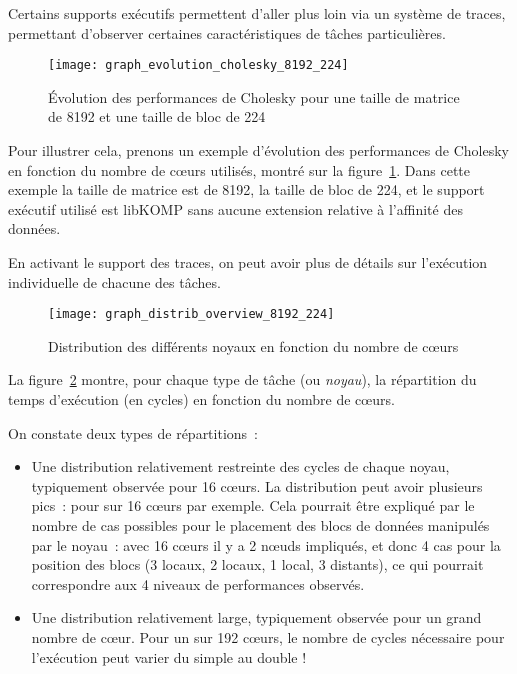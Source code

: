 Certains supports exécutifs permettent d'aller plus loin via un système de traces, permettant d'observer certaines caractéristiques de tâches particulières.

\begin{figure}[t!]
  \centering
  \texttt{[image: graph\_evolution\_cholesky\_8192\_224]}
  \caption{Évolution des performances de Cholesky pour une taille de matrice de 8192 et une taille de bloc de 224}\label{fig:contribs:apps:cholesky:overview-8192-224}
\end{figure}

Pour illustrer cela, prenons un exemple d'évolution des performances de Cholesky en fonction du nombre de cœurs utilisés, montré sur la figure~\ref{fig:contribs:apps:cholesky:overview-8192-224}. Dans cette exemple la taille de matrice est de 8192, la taille de bloc de 224, et le support exécutif utilisé est libKOMP sans aucune extension relative à l'affinité des données.

En activant le support des traces, on peut avoir plus de détails sur l'exécution individuelle de chacune des tâches.

\begin{figure}[h!]
  \centering
  \texttt{[image: graph\_distrib\_overview\_8192\_224]}
  \caption{Distribution des différents noyaux en fonction du nombre de cœurs}\label{fig:contribs:apps:cholesky:distrib-overview-8192-224}
\end{figure}

La figure~\ref{fig:contribs:apps:cholesky:distrib-overview-8192-224} montre, pour chaque type de tâche (ou \emph{noyau}), la répartition du temps d'exécution (en cycles) en fonction du nombre de cœurs.

On constate deux types de répartitions~:
\begin{itemize}
  \item Une distribution relativement restreinte des cycles de chaque noyau, typiquement observée pour 16 cœurs.
    La distribution peut avoir plusieurs pics~: pour \gemm sur 16 cœurs par exemple.
    Cela pourrait être expliqué par le nombre de cas possibles pour le placement des blocs de données manipulés par le noyau~: avec 16 cœurs il y a 2 nœuds impliqués, et donc 4 cas pour la position des blocs (3 locaux, 2 locaux, 1 local, 3 distants), ce qui pourrait correspondre aux 4 niveaux de performances observés.
  \item Une distribution relativement large, typiquement observée pour un grand nombre de cœur. Pour un \gemm sur 192 cœurs, le nombre de cycles nécessaire pour l'exécution peut varier du simple au double !
\end{itemize}

